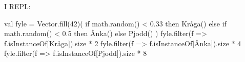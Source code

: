 I REPL:
\begin{REPL}
val fyle = Vector.fill(42)(
  if math.random() < 0.33 then Kråga()
  else if math.random() < 0.5 then Ånka()
  else Pjodd()
)
fyle.filter(f => f.isInstanceOf[Kråga]).size * 2
fyle.filter(f => f.isInstanceOf[Ånka]).size * 4
fyle.filter(f => f.isInstanceOf[Pjodd]).size * 8
\end{REPL}

\QUESTEND














